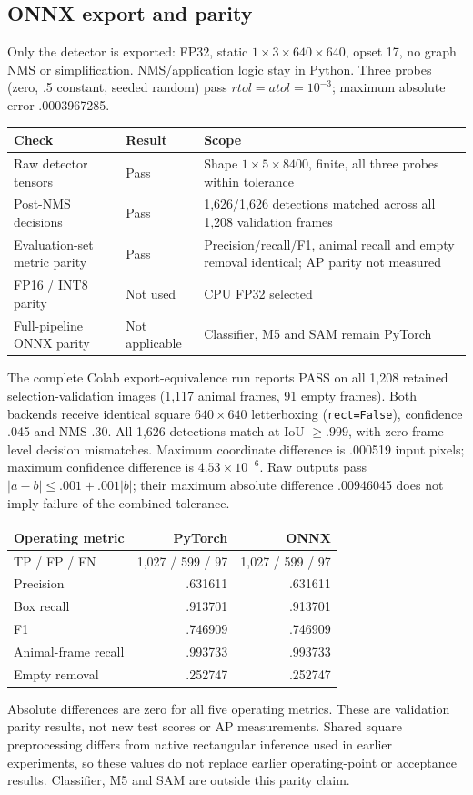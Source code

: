 \documentclass[11pt,a4paper]{article}
\begin{document}
\subsection{ONNX export and parity}
Only the detector is exported: FP32, static $1\times3\times640\times640$, opset 17, no graph NMS or simplification. NMS/application logic stay in Python. Three probes (zero, .5 constant, seeded random) pass $rtol=atol=10^{-3}$; maximum absolute error .0003967285.
\par\noindent\begin{tabularx}{\linewidth}{@{}Y l Y@{}}\toprule
Check & Result & Scope\\\midrule
Raw detector tensors & Pass & Shape $1\times5\times8400$, finite, all three probes within tolerance\\
Post-NMS decisions & Pass & 1,626/1,626 detections matched across all 1,208 validation frames\\
Evaluation-set metric parity & Pass & Precision/recall/F1, animal recall and empty removal identical; AP parity not measured\\
FP16 / INT8 parity & Not used & CPU FP32 selected\\
Full-pipeline ONNX parity & Not applicable & Classifier, M5 and SAM remain PyTorch\\\bottomrule
\end{tabularx}\par

The complete Colab export-equivalence run reports PASS on all 1,208 retained selection-validation images (1,117 animal frames, 91 empty frames). Both backends receive identical square $640\times640$ letterboxing (\texttt{rect=False}), confidence .045 and NMS .30. All 1,626 detections match at IoU $\geq .999$, with zero frame-level decision mismatches. Maximum coordinate difference is .000519 input pixels; maximum confidence difference is $4.53\times10^{-6}$. Raw outputs pass $|a-b|\leq .001+.001|b|$; their maximum absolute difference .00946045 does not imply failure of the combined tolerance.

\begin{center}\begin{tabular}{lrr}\toprule
Operating metric & PyTorch & ONNX\\\midrule
TP / FP / FN & 1,027 / 599 / 97 & 1,027 / 599 / 97\\
Precision & .631611 & .631611\\
Box recall & .913701 & .913701\\
F1 & .746909 & .746909\\
Animal-frame recall & .993733 & .993733\\
Empty removal & .252747 & .252747\\\bottomrule
\end{tabular}\end{center}
Absolute differences are zero for all five operating metrics. These are validation parity results, not new test scores or AP measurements. Shared square preprocessing differs from native rectangular inference used in earlier experiments, so these values do not replace earlier operating-point or acceptance results. Classifier, M5 and SAM are outside this parity claim.
\end{document}
